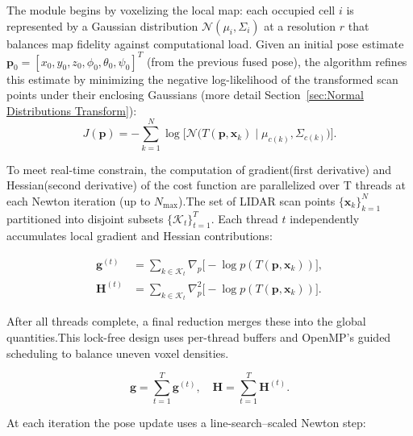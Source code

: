 The module begins by voxelizing the local map: each occupied cell \(i\) is represented by a Gaussian distribution \(\mathcal{N}(\mu_i,\Sigma_i)\) at a resolution \(r\) that balances map fidelity against computational load. Given an initial pose estimate \(\mathbf{p}_0 = [x_0,y_0,z_0,\phi_0,\theta_0,\psi_0]^T\) (from the previous fused pose), the algorithm refines this estimate by minimizing the negative log-likelihood of the transformed scan points under their enclosing Gaussians (more detail Section~\ref{sec:Normal Distributions Transform}):
\[
J(\mathbf{p}) = -\sum_{k=1}^N \log\bigl[\mathcal{N}\bigl(T(\mathbf{p},\mathbf{x}_k)\mid\mu_{c(k)},\Sigma_{c(k)}\bigr)\bigr].
\]


To meet real-time constrain, the computation of gradient(first derivative) and Hessian(second derivative) of the cost function are parallelized over T threads at each Newton iteration (up to \(N_{\max}\)).The set of LIDAR scan points \(\{\mathbf{x}_k\}_{k=1}^N\) partitioned into disjoint subsets \(\{\mathcal{K}_t\}_{t=1}^T\). Each thread \(t\) independently accumulates local gradient and Hessian contributions:

\begin{align}
	\label{eq:local-gradient}
	\mathbf{g}^{(t)}
	&= \sum_{k\in\mathcal{K}_t} \nabla_{\!p}\bigl[-\log p(T(\mathbf{p},\mathbf{x}_k))\bigr],\\
	\label{eq:local-hessian}
	\mathbf{H}^{(t)}
	&= \sum_{k\in\mathcal{K}_t} \nabla^2_{\!p}\bigl[-\log p(T(\mathbf{p},\mathbf{x}_k))\bigr].
\end{align}

After all threads complete, a final reduction merges these into the global quantities.This lock-free design uses per-thread buffers and OpenMP’s guided scheduling to balance uneven voxel densities.


\begin{equation}
	\label{eq:reduction}
	\mathbf{g} = \sum_{t=1}^T \mathbf{g}^{(t)},
	\quad
	\mathbf{H} = \sum_{t=1}^T \mathbf{H}^{(t)}.
\end{equation}


At each iteration the pose update uses a line-search–scaled Newton step:

